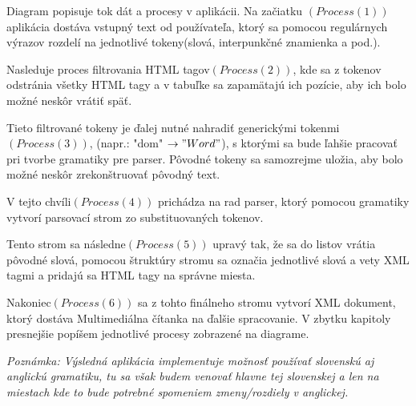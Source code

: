 \documentclass[12pt,a4paper]{report}
\theoremstyle{definition}
\theoremstyle{remark}
\begin{document}
Diagram popisuje tok dát a procesy v aplikácii. Na začiatku $(Process (1))$ aplikácia dostáva vstupný text od používateľa, ktorý sa pomocou regulárnych výrazov rozdelí na jednotlivé tokeny(slová, interpunkčné znamienka a pod.).

 Nasleduje proces filtrovania HTML tagov$(Process (2))$, kde sa z tokenov odstránia všetky HTML tagy a v tabuľke sa zapamätajú ich pozície, aby ich bolo možné neskôr vrátiť späť. 
 
Tieto filtrované tokeny je ďalej nutné nahradiť generickými tokenmi$(Process (3))$, (napr.: "dom" $\to  "Word"$), s ktorými sa bude ľahšie pracovať pri tvorbe gramatiky pre parser. Pôvodné tokeny sa samozrejme uložia, aby bolo možné neskôr zrekonštruovať pôvodný text. 

V tejto chvíli$(Process(4))$ prichádza na rad parser, ktorý pomocou gramatiky vytvorí parsovací strom zo substituovaných tokenov. 

Tento strom sa následne$(Process (5))$ upravý tak, že sa do listov vrátia pôvodné slová, pomocou štruktúry stromu sa označia jednotlivé slová a vety XML tagmi a pridajú sa HTML tagy na správne miesta. 

Nakoniec$(Process (6))$ sa z tohto finálneho stromu vytvorí XML dokument, ktorý dostáva Multimediálna čítanka na ďalšie spracovanie. V zbytku kapitoly presnejšie popíšem jednotlivé procesy zobrazené na diagrame.

\textit{Poznámka: Výsledná aplikácia implementuje možnosť používať slovenskú aj anglickú gramatiku, tu sa však budem venovať hlavne tej slovenskej a len na miestach kde to bude potrebné spomeniem zmeny/rozdiely v anglickej.}
\end{document}
